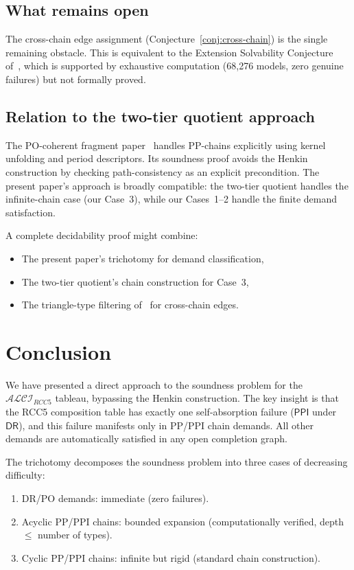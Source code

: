 \documentclass[a4paper,11pt]{article}
\theoremstyle{definition}
\newcommand{\ALCIRCC}[1]{\ensuremath{\mathcal{ALCI}_{\mathit{RCC#1}}}}
\newcommand{\DR}{\ensuremath{\mathsf{DR}}}
\newcommand{\PPI}{\ensuremath{\mathsf{PPI}}}
\begin{document}
\subsection{What remains open}

The cross-chain edge assignment
(Conjecture~\ref{conj:cross-chain}) is the single remaining
obstacle.  This is equivalent to the Extension Solvability
Conjecture of~\cite{TrianglePaper}, which is supported by
exhaustive computation (68,276 models, zero genuine failures)
but not formally proved.

\subsection{Relation to the two-tier quotient approach}

The PO-coherent fragment paper~\cite{TwoTierPaper} handles
PP-chains explicitly using kernel unfolding and period descriptors.
Its soundness proof avoids the Henkin construction by checking
path-consistency as an explicit precondition.  The present paper's
approach is broadly compatible: the two-tier quotient handles the
infinite-chain case (our Case~3), while our Cases~1--2 handle the
finite demand satisfaction.

A complete decidability proof might combine:
\begin{itemize}[nosep]
  \item The present paper's trichotomy for demand classification,
  \item The two-tier quotient's chain construction for Case~3,
  \item The triangle-type filtering of~\cite{TrianglePaper} for
    cross-chain edges.
\end{itemize}


\section{Conclusion}
\label{sec:conclusion}

We have presented a direct approach to the soundness problem for
the $\ALCIRCC{5}$ tableau, bypassing the Henkin construction.  The
key insight is that the RCC5 composition table has exactly one
self-absorption failure ($\PPI$ under $\DR$), and this failure
manifests only in PP/PPI chain demands.  All other demands are
automatically satisfied in any open completion graph.

The trichotomy decomposes the soundness problem into three cases
of decreasing difficulty:
\begin{enumerate}[nosep]
  \item DR/PO demands: immediate (zero failures).
  \item Acyclic PP/PPI chains: bounded expansion (computationally
    verified, depth $\leq$ number of types).
  \item Cyclic PP/PPI chains: infinite but rigid (standard chain
    construction).
\end{enumerate}
\end{document}
